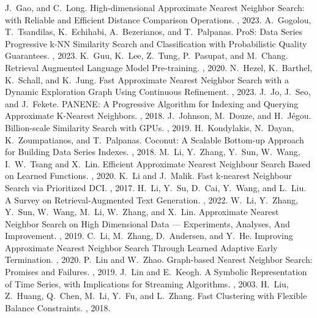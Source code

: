 \documentclass[11pt]{article}
\begin{document}
\begin{thebibliography}{10}
\begin{footnotesize}
J.~Gao, and C.~Long. \newblock High-dimensional Approximate Nearest Neighbor Search: with Reliable and Efficient Distance Comparison Operations. , 2023.
A.~Gogolou, T.~Tsandilas, K.~Echihabi, A.~Bezerianos, and T.~Palpanas. \newblock  ProS: Data Series Progressive k-NN Similarity Search and Classification with Probabilistic Quality Guarantees. , 2023.
 K.~Guu, K.~Lee, Z.~Tung, P.~Pasupat, and M.~Chang. \newblock Retrieval Augmented Language Model Pre-training. , 2020.
N.~Hezel, K.~Barthel, K.~Schall, and K.~Jung. \newblock Fast Approximate Nearest Neighbor Search with a Dynamic Exploration Graph Using Continuous Refinement. , 2023.
J.~Jo, J.~Seo, and J.~Fekete. \newblock PANENE: A Progressive Algorithm for Indexing and Querying Approximate K-Nearest Neighbors. , 2018.  
J.~Johnson, M.~Douze, and H.~J{\'e}gou. \newblock Billion-scale Similarity Search with GPUs. , 2019.
H.~Kondylakis, N.~Dayan, K.~Zoumpatianos, and T.~Palpanas. \newblock Coconut: A Scalable Bottom-up Approach for Building Data Series Indexes. , 2018.
M.~Li, Y.~Zhang, Y.~Sun, W.~Wang, I.~W.~Tsang and X.~Lin.  Efficient Approximate Nearest Neighbour Search Based on Learned Functions. , 2020.
K.~Li and J.~Malik. \newblock  Fast k-nearest Neighbour Search via Prioritized {DCI}. , 2017.
 H.~Li, Y.~Su, D.~Cai, Y.~Wang, and L.~Liu. \newblock A Survey on Retrieval-Augmented Text Generation. , 2022.
W.~Li, Y.~Zhang, Y.~Sun, W.~Wang, M.~Li, W.~Zhang, and X.~Lin. \newblock Approximate Nearest Neighbor Search on High Dimensional Data — Experiments, Analyses, And Improvement. , 2019.
C.~Li, M.~Zhang, D.~Andersen, and Y.~He. \newblock Improving Approximate Nearest Neighbor Search Through Learned Adaptive Early Termination. , 2020.
P.~Lin and W.~Zhao. \newblock  Graph-based Nearest Neighbor Search: Promises and Failures. , 2019.
J.~Lin and E.~Keogh. \newblock  A Symbolic Representation of Time Series, with Implications for Streaming Algorithms. , 2003.
H.~Liu, Z.~Huang, Q.~Chen, M.~Li, Y.~Fu, and L.~Zhang. \newblock Fast Clustering with Flexible Balance Constraints. , 2018.

\end{footnotesize}
\end{thebibliography}
\end{document}
